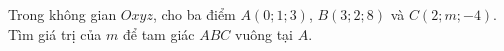 \begin{ex}
Trong không gian $Oxyz$, cho ba điểm $A(0;1;3)$, $B(3;2;8)$ và $C(2;m;-4)$. Tìm giá trị của $m$ để tam giác $ABC$ vuông tại $A$.
\end{ex}

